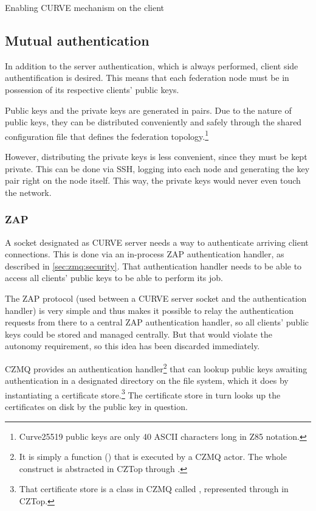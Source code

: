 \begin{listing}
	\inputminted[bgcolor=bg]{Ruby}{listings/auth/fednf.rb}
	\caption{Enabling CURVE mechanism on the client}
	\label{lst:auth:fednf}
\end{listing}

\subsection{Mutual authentication}
In addition to the server authentication, which is always performed, client
side authentification is desired. This means that each federation node must be
in possession of its respective clients' public keys.

Public keys and the private keys are generated in pairs.  Due to
the nature of public keys, they can be distributed conveniently and safely
through the shared configuration file that defines the federation
topology.\footnote{Curve25519 public keys are only 40 ASCII characters long in
\gls{Z85} notation.}

However, distributing the private keys is less convenient, since they must be kept
private. This can be done via \gls{SSH}, logging into each node and generating
the key pair right on the node itself. This way, the private keys would never
even touch the network.

\subsubsection{ZAP}
A socket designated as CURVE server needs a way to authenticate arriving client
connections. This is done via an in-process \gls{ZAP} authentication handler,
as described in \autoref{sec:zmq:security}. That authentication handler
needs to be able to access all clients' public keys to be able to perform its
job.

The ZAP protocol (used between a CURVE server socket and the authentication
handler) is very simple and thus makes it possible to relay the authentication
requests from there to a central ZAP authentication handler, so all clients'
public keys could be stored and managed centrally. But that would violate the
autonomy requirement, so this idea has been discarded immediately.

CZMQ provides an authentication handler\footnote{It is simply a function
() that is executed by a CZMQ actor. The whole construct is
abstracted in CZTop through .} that can lookup public
keys awaiting authentication in a designated directory on the file system,
which it does by instantiating a certificate store.\footnote{That certificate
store is a class in CZMQ called , represented through
 in CZTop.} The certificate store in turn looks up the
certificates on disk by the public key in question.

